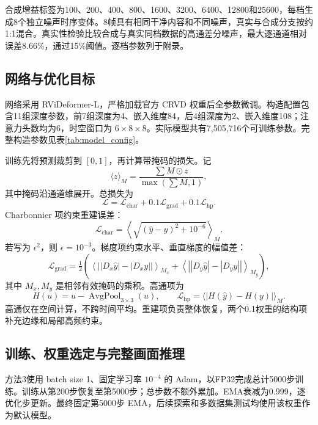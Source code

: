\documentclass[11pt,a4paper,UTF8,fontset=fandol]{ctexart}
\begin{document}
合成增益标签为100、200、400、800、1600、3200、6400、12800和25600，每档生成8个独立噪声时序变体。8帧具有相同干净内容和不同噪声，真实与合成分支按约1:1混合。真实性检验比较合成与真实同档数据的高通差分噪声，最大逐通道相对误差8.66\%，通过15\%阈值。逐档参数列于附录。

\subsection{网络与优化目标}

网络采用 RViDeformer-L，严格加载官方 CRVD 权重后全参数微调。构造配置包含11组深度参数，前7组深度为4、嵌入维度84，后4组深度为2、嵌入维度108；注意力头数均为6，时空窗口为 $6\times8\times8$。实际模型共有7,505,716个可训练参数。完整构造参数见表\ref{tab:model_config}。

训练先将预测裁剪到 $[0,1]$，再计算带掩码的损失。记
\begin{equation}
 \langle z\rangle_M=\frac{\sum M\odot z}{\max(\sum M,1)},
\end{equation}
其中掩码沿通道维展开。总损失为
\begin{equation}
 \mathcal L=\mathcal L_{\mathrm{char}}+0.1\mathcal L_{\mathrm{grad}}+0.1\mathcal L_{\mathrm{hp}}.
 \label{eq:loss}
\end{equation}
Charbonnier 项\cite{r13}约束重建误差：
\begin{equation}
 \mathcal L_{\mathrm{char}}=\left\langle\sqrt{(\hat y-y)^2+10^{-6}}\right\rangle_M.
\end{equation}
若写为 $\epsilon^2$，则 $\epsilon=10^{-3}$。梯度项约束水平、垂直梯度的幅值差：
\begin{equation}
 \mathcal L_{\mathrm{grad}}=\tfrac12\left(
 \left\langle\left||D_x\hat y|-|D_xy|\right|\right\rangle_{M_x}+
 \left\langle\left||D_y\hat y|-|D_yy|\right|\right\rangle_{M_y}\right),
\end{equation}
其中 $M_x,M_y$ 是相邻有效掩码的乘积。高通项为
\begin{equation}
 H(u)=u-\operatorname{AvgPool}_{3\times3}(u),\qquad
 \mathcal L_{\mathrm{hp}}=\langle|H(\hat y)-H(y)|\rangle_M.
\end{equation}
高通仅在空间计算，不跨时间平均。重建项负责整体恢复，两个0.1权重的结构项补充边缘和局部高频约束。

\subsection{训练、权重选定与完整画面推理}

方法3使用 batch size 1、固定学习率 $10^{-4}$ 的 Adam，以FP32完成总计5000步训练。训练从第200步恢复至第5000步；总步数不额外累加。EMA衰减为0.999，逐优化步更新。最终固定第5000步 EMA，后续探索和多数据集测试均使用该权重作为默认模型。
\end{document}
